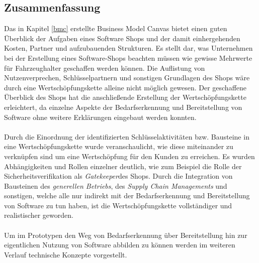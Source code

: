\subsection{Zusammenfassung}
Das in Kapitel \ref{bmc} erstellte Business Model Canvas bietet einen guten Überblick der Aufgaben eines Software Shops und der damit einhergehenden Kosten, Partner und aufzubauenden Strukturen. Es stellt dar, was Unternehmen bei der Erstellung eines Software-Shops beachten müssen wie gewisse Mehrwerte für Fahrzeughalter geschaffen werden können. Die Auflistung von Nutzenverprechen, Schlüsselpartnern und sonstigen Grundlagen des Shops wäre durch eine Wertschöpfungskette alleine nicht möglich gewesen. Der geschaffene Überblick des Shops hat die anschließende Erstellung der Wertschöpfungskette erleichtert, da einzelne Aspekte der Bedarfserkennung und Bereitstellung von Software ohne weitere Erklärungen eingebaut werden konnten.\\\\
Durch die Einordnung der identifizierten Schlüsselaktivitäten bzw. Bausteine in eine Wertschöpfungskette wurde veranschaulicht, wie diese miteinander zu verknüpfen sind um eine Wertschöpfung für den Kunden zu erreichen. Es wurden Abhängigkeiten und Rollen einzelner deutlich, wie zum Beispiel die Rolle der Sicherheitsverifikation als \glqq\textit{Gatekeeper}\grqq des Shops. Durch die Integration von Bausteinen des \textit{generellen Betriebs}, des \textit{Supply Chain Managements} und sonstigen, welche alle nur indirekt mit der Bedarfserkennung und Bereitstellung von Software zu tun haben, ist die Wertschöpfungskette vollständiger und realistischer geworden.\\\\
Um im Prototypen den Weg von Bedarfserkennung über Bereitstellung hin zur eigentlichen Nutzung von Software abbilden zu können werden im weiteren Verlauf technische Konzepte vorgestellt.